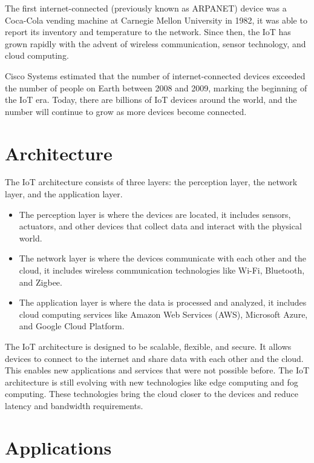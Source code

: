 The first internet-connected (previously known as ARPANET) device was a Coca-Cola vending machine at Carnegie Mellon
University in 1982,\cite{cscmuedu} it was able to report its inventory and temperature to the network. Since then,
the IoT has grown rapidly with the advent of wireless communication, sensor technology, and cloud computing.

Cisco Systems estimated that the number of internet-connected devices exceeded the number of people on Earth between
2008 and 2009,\cite{evans-2011} marking the beginning of the IoT era. Today, there are billions of IoT devices around
the world, and the number will continue to grow as more devices become connected.

\section{Architecture}
\label{sec:iot-architecture}

The IoT architecture consists of three layers: the perception layer, the network layer, and the application layer.
\begin{itemize}
  \item The perception layer is where the devices are located, it includes sensors, actuators, and other devices that
        collect data and interact with the physical world.
  \item The network layer is where the devices communicate with each other and the cloud, it includes wireless
        communication technologies like Wi-Fi, Bluetooth, and Zigbee.
  \item The application layer is where the data is processed and analyzed, it includes cloud computing services like
        Amazon Web Services (AWS), Microsoft Azure, and Google Cloud Platform.
\end{itemize}

The IoT architecture is designed to be scalable, flexible, and secure. It allows devices to connect to the internet and
share data with each other and the cloud. This enables new applications and services that were not possible before. The
IoT architecture is still evolving with new technologies like edge computing and fog computing. These technologies bring
the cloud closer to the devices and reduce latency and bandwidth requirements.

\section{Applications}
\label{sec:iot-applications}

